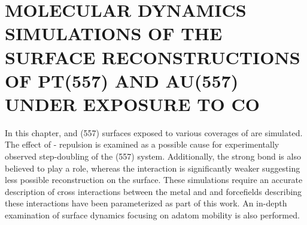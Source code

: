 \chapter{MOLECULAR DYNAMICS SIMULATIONS OF THE SURFACE RECONSTRUCTIONS OF PT(557) AND AU(557) UNDER EXPOSURE TO CO}
\label{chap:PtAu}





In this chapter,  and  (557) surfaces exposed to various
coverages of  are simulated. The effect of - repulsion is
examined as a possible cause for experimentally observed step-doubling of the
 (557) system. Additionally, the strong  bond is also
believed to play a role, whereas the  interaction is
significantly weaker suggesting less possible reconstruction on the 
surface. These simulations require an accurate description of cross
interactions between the metal and  and forcefields describing these
interactions have been parameterized as part of this work. An in-depth
examination of surface dynamics focusing on adatom mobility is also performed.




